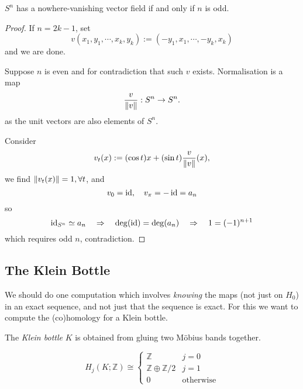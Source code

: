 \documentclass[a4paper,11pt]{article}
\begin{document}
	\begin{prop}
		$S^n$ has a nowhere-vanishing vector field if and only if $n$ is odd.
	\end{prop}

	\begin{proof}
		If $n = 2k-1$, set 
		\[
			v(x_1,y_1, \cdots, x_k, y_k) := (-y_1,x_1,\cdots, -y_k, x_k)
		\]
		and we are done.

		Suppose $n$ is even and for contradiction that such $v$ exists. Normalisation is a map
		\[
			\frac{v}{\norm{v}} : S^n \to S^n.
		\]
		as the unit vectors are also elements of $S^n$.

		Consider 
		\[
			v_t(x):= (\cos t)x + (\sin t) \frac{v}{\norm{v}}(x),
		\]
		we find $\norm{v_t(x)} = 1, \forall t$, and
		\[
			v_0 = \operatorname{id}, \quad v_\pi = - \operatorname{id} = a_n
		\]
		so
		\[
			\operatorname{id} _{S^n} \simeq a_n \quad \Rightarrow \quad \deg(\operatorname{id}) = \deg(a_n) \quad \Rightarrow \quad 1 = (-1)^{n+1}
		\]
		which requires odd $n$, contradiction.
	\end{proof}

	\subsection{The Klein Bottle} 

	We should do one computation which involves \emph{knowing} the maps (not just on $H_0$) in an exact sequence, and not just that the sequence is exact. For this we want to compute the (co)homology for a Klein bottle.

	The \emph{Klein bottle} $K$ is obtained from gluing two M\"obius bands together.


	\begin{lem}
		$$H_j(K; \mathbb{Z})\cong \begin{cases}
			\mathbb{Z} & j=0\\
			\mathbb{Z} \oplus \mathbb{Z}/2 & j=1\\
			0 & \text{otherwise}
		\end{cases}$$
	\end{lem}
\end{document}
